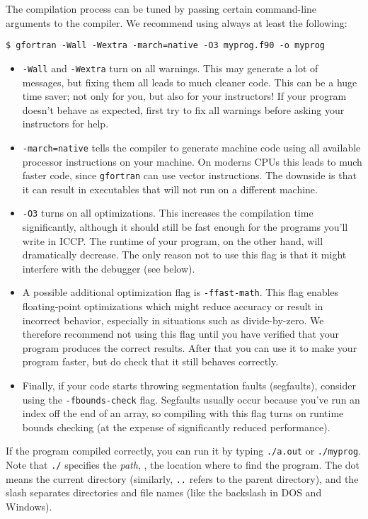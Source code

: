The compilation process can be tuned by passing certain command-line arguments to the compiler.
We recommend using always at least the following:
\begin{verbatim}
$ gfortran -Wall -Wextra -march=native -O3 myprog.f90 -o myprog
\end{verbatim}
\begin{itemize}
  \item \texttt{-Wall} and \texttt{-Wextra} turn on all warnings.
    This may generate a lot of messages, but fixing them all leads to much cleaner code.
    This can be a huge time saver; not only for you, but also for your instructors!
    If your program doesn't behave as expected, first try to fix all warnings before asking your instructors for help.
  \item \texttt{-march=native} tells the compiler to generate machine code using all available processor instructions on your machine.
    On moderns CPUs this leads to much faster code, since \texttt{gfortran} can use vector instructions.
    The downside is that it can result in executables that will not run on a different machine.
  \item \texttt{-O3} turns on all optimizations.
    This increases the compilation time significantly, although it should still be fast enough for the programs you'll write in ICCP.
    The runtime of your program, on the other hand, will dramatically decrease.
    The only reason not to use this flag is that it might interfere with the debugger (see below).
  \item A possible additional optimization flag is \texttt{-ffast-math}.
    This flag enables floating-point optimizations which might reduce accuracy or result in incorrect behavior, especially in situations such as divide-by-zero.
    We therefore recommend not using this flag until you have verified that your program produces the correct results.
    After that you can use it to make your program faster, but do check that it still behaves correctly.
  \item Finally, if your code starts throwing segmentation faults (segfaults), consider using the \texttt{-fbounds-check} flag.
    Segfaults usually occur because you've run an index off the end of an array, so compiling with this flag turns on runtime bounds checking (at the expense of significantly reduced performance).
\end{itemize}
If the program compiled correctly, you can run it by typing \texttt{./a.out} or \texttt{./myprog}.
Note that \texttt{./} specifies the \emph{path}, \ie, the location where to find the program.
The dot means the current directory (similarly, \texttt{..} refers to the parent directory), and the slash separates directories and file names (like the backslash in DOS and Windows).


